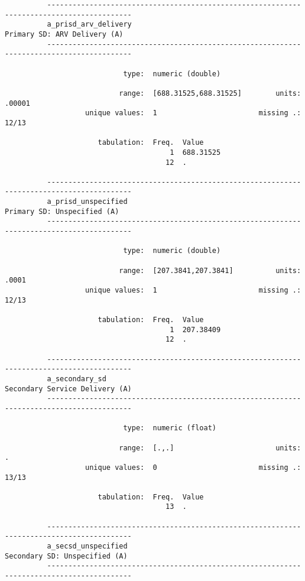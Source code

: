 \documentclass{article}
\begin{document}
\begin{verbatim}
          ------------------------------------------------------------------------------------------
          a_prisd_arv_delivery                                          Primary SD: ARV Delivery (A)
          ------------------------------------------------------------------------------------------
          
                            type:  numeric (double)
          
                           range:  [688.31525,688.31525]        units:  .00001
                   unique values:  1                        missing .:  12/13
          
                      tabulation:  Freq.  Value
                                       1  688.31525
                                      12  .
          
          ------------------------------------------------------------------------------------------
          a_prisd_unspecified                                            Primary SD: Unspecified (A)
          ------------------------------------------------------------------------------------------
          
                            type:  numeric (double)
          
                           range:  [207.3841,207.3841]          units:  .0001
                   unique values:  1                        missing .:  12/13
          
                      tabulation:  Freq.  Value
                                       1  207.38409
                                      12  .
          
          ------------------------------------------------------------------------------------------
          a_secondary_sd                                              Secondary Service Delivery (A)
          ------------------------------------------------------------------------------------------
          
                            type:  numeric (float)
          
                           range:  [.,.]                        units:  .
                   unique values:  0                        missing .:  13/13
          
                      tabulation:  Freq.  Value
                                      13  .
          
          ------------------------------------------------------------------------------------------
          a_secsd_unspecified                                          Secondary SD: Unspecified (A)
          ------------------------------------------------------------------------------------------
          

\end{verbatim}
\end{document}
